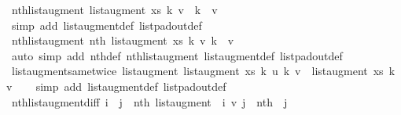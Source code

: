 \begin{isabellebody}
\endisatagproof
{\isafoldproof}%
%
\isadelimproof
\isanewline
%
\endisadelimproof
\isanewline
{}\isamarkupfalse%
\ nth{\isacharunderscore}list{\isacharunderscore}augment{\isacharcolon}\ {\isachardoublequoteopen}list{\isacharunderscore}augment\ xs\ k\ v\ {\isacharbang}\ k\ {\isacharequal}\ v{\isachardoublequoteclose}\isanewline
%
\isadelimproof
\ \ %
\endisadelimproof
%
\isatagproof
{}\isamarkupfalse%
\ {\isacharparenleft}simp\ add{\isacharcolon}\ list{\isacharunderscore}augment{\isacharunderscore}def\ list{\isacharunderscore}pad{\isacharunderscore}out{\isacharunderscore}def{\isacharparenright}%
\endisatagproof
{\isafoldproof}%
%
\isadelimproof
\isanewline
%
\endisadelimproof
\isanewline
{}\isamarkupfalse%
\ nth{\isacharprime}{\isacharunderscore}list{\isacharunderscore}augment{\isacharcolon}\ {\isachardoublequoteopen}nth{\isacharprime}\ {\isacharparenleft}list{\isacharunderscore}augment\ xs\ k\ v{\isacharparenright}\ k\ {\isacharequal}\ v{\isachardoublequoteclose}\isanewline
%
\isadelimproof
\ \ %
\endisadelimproof
%
\isatagproof
{}\isamarkupfalse%
\ {\isacharparenleft}auto\ simp\ add{\isacharcolon}\ nth{\isacharprime}{\isacharunderscore}def\ nth{\isacharunderscore}list{\isacharunderscore}augment\ list{\isacharunderscore}augment{\isacharunderscore}def\ list{\isacharunderscore}pad{\isacharunderscore}out{\isacharunderscore}def{\isacharparenright}%
\endisatagproof
{\isafoldproof}%
%
\isadelimproof
\isanewline
%
\endisadelimproof
\isanewline
{}\isamarkupfalse%
\ list{\isacharunderscore}augment{\isacharunderscore}same{\isacharunderscore}twice{\isacharcolon}\ {\isachardoublequoteopen}list{\isacharunderscore}augment\ {\isacharparenleft}list{\isacharunderscore}augment\ xs\ k\ u{\isacharparenright}\ k\ v\ {\isacharequal}\ list{\isacharunderscore}augment\ xs\ k\ v{\isachardoublequoteclose}\isanewline
%
\isadelimproof
\ \ %
\endisadelimproof
%
\isatagproof
{}\isamarkupfalse%
\ {\isacharparenleft}simp\ add{\isacharcolon}\ list{\isacharunderscore}augment{\isacharunderscore}def\ list{\isacharunderscore}pad{\isacharunderscore}out{\isacharunderscore}def{\isacharparenright}%
\endisatagproof
{\isafoldproof}%
%
\isadelimproof
\isanewline
%
\endisadelimproof
\isanewline
{}\isamarkupfalse%
\ nth{\isacharprime}{\isacharunderscore}list{\isacharunderscore}augment{\isacharunderscore}diff{\isacharcolon}\ {\isachardoublequoteopen}i\ {\isasymnoteq}\ j\ {\isasymLongrightarrow}\ nth{\isacharprime}\ {\isacharparenleft}list{\isacharunderscore}augment\ {\isasymsigma}\ i\ v{\isacharparenright}\ j\ {\isacharequal}\ nth{\isacharprime}\ {\isasymsigma}\ j{\isachardoublequoteclose}\isanewline

\end{isabellebody}
